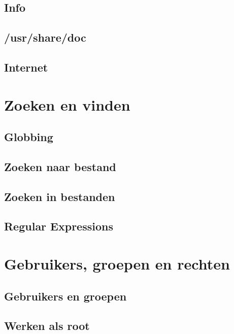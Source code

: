 \documentclass[a4paper,12pt,twoside,openright,titlepage]{book}
\begin{document}
\section{Info}

\section{/usr/share/doc}

\section{Internet}


\chapter{Zoeken en vinden}\label{zoekenenvinden}

\section{Globbing}

\section{Zoeken naar bestand}


\section{Zoeken in bestanden}
\section{Regular Expressions}

\chapter{Gebruikers, groepen en rechten}

\section{Gebruikers en groepen}


\section{Werken als root}

\end{document}
